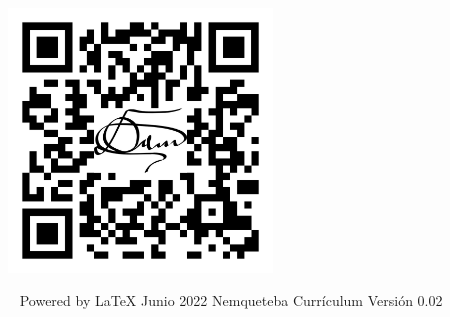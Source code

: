 \documentclass[overlapped,line,final]{res}
\begin{document}
\begin{resume}




\vspace{\fill}
\begin{minipage}{1.0\linewidth}
\begin{center}	
	\includegraphics[width=7cm,bb=0 0 1147 1147]{./qr.png}
\end{center}
\end{minipage}


\vspace{\fill}\ \newline
{\tiny \rm $ $Powered by \LaTeX $ $ }
{\tiny \rm $ $Junio 2022$ $ }
{\tiny \rm $ $Nemqueteba Currículum Versión 0.02 $ $ }

\end{resume}
\end{document}
